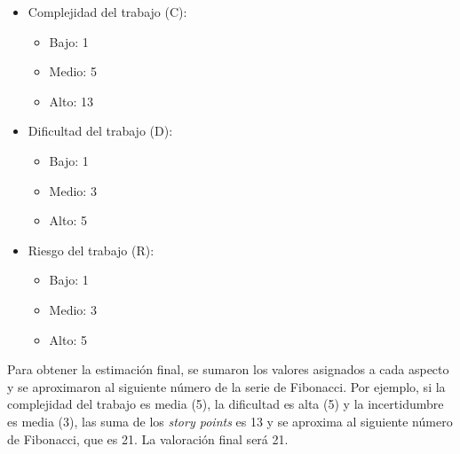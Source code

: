 \documentclass[
11pt, %
codirector, %
]{charter}
\begin{document}
\begin{itemize}
	\item Complejidad del trabajo (C):
	\begin{itemize}
		\item Bajo: 1
		\item Medio: 5
		\item Alto: 13		
	\end{itemize}
	\item Dificultad del trabajo (D):
	\begin{itemize}
		\item Bajo: 1
		\item Medio: 3
		\item Alto: 5		
	\end{itemize}
	\item Riesgo del trabajo (R):
	\begin{itemize}
		\item Bajo: 1
		\item Medio: 3
		\item Alto: 5		
	\end{itemize}
\end{itemize}

Para obtener la estimación final, se sumaron los valores asignados a cada aspecto y se aproximaron
al siguiente número de la serie de Fibonacci. Por ejemplo, si la complejidad del trabajo es media (5), la dificultad es alta (5) y la incertidumbre es media (3), las suma de los \textit{story points} es 13 y se aproxima al siguiente número de Fibonacci, que es 21. La valoración final será 21.
\end{document}
